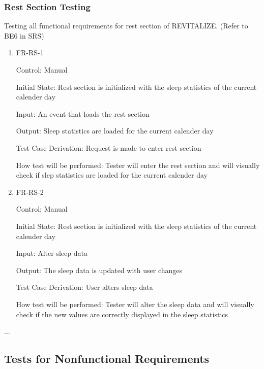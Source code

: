 \documentclass[12pt, titlepage]{article}
\begin{document}
\subsubsection{Rest Section Testing}

Testing all functional requirements for rest section of REVITALIZE. (Refer to BE6 in SRS)

\begin{enumerate}

\item{FR-RS-1\\}

Control: Manual
					
Initial State: Rest section is initialized with the sleep statistics of the current calender day
					
Input: An event that loads the rest section
					
Output: Sleep statistics are loaded for the current calender day

Test Case Derivation: Request is made to enter rest section

How test will be performed: Tester will enter the rest section and will visually check if slep statistics are loaded for the current calender day
					
\item{FR-RS-2 \\}

Control: Manual
					
Initial State: Rest section is initialized with the sleep statistics of the current calender day
					
Input: Alter sleep data
					
Output: The sleep data is updated with user changes

Test Case Derivation: User alters sleep data

How test will be performed: Tester will alter the sleep data and will visually check if the new values are correctly displayed in the sleep statistics

\end{enumerate}
...

\subsection{Tests for Nonfunctional Requirements}

\end{document}
